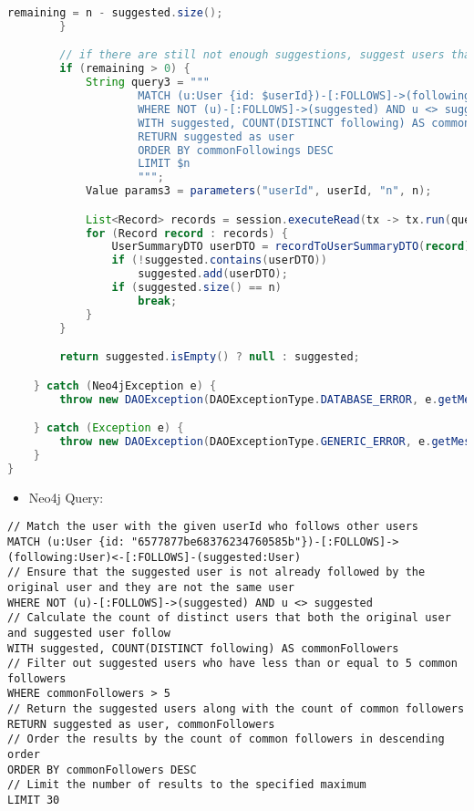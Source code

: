 \begin{mdframed}[style=customstyle]
\begin{lstlisting}[language=java]
            remaining = n - suggested.size();
        }

        // if there are still not enough suggestions, suggest users that follow the user's followings
        if (remaining > 0) {
            String query3 = """
                    MATCH (u:User {id: $userId})-[:FOLLOWS]->(following:User)<-[:FOLLOWS]-(suggested:User)
                    WHERE NOT (u)-[:FOLLOWS]->(suggested) AND u <> suggested
                    WITH suggested, COUNT(DISTINCT following) AS commonFollowings
                    RETURN suggested as user
                    ORDER BY commonFollowings DESC
                    LIMIT $n
                    """;
            Value params3 = parameters("userId", userId, "n", n);

            List<Record> records = session.executeRead(tx -> tx.run(query3, params3).list());
            for (Record record : records) {
                UserSummaryDTO userDTO = recordToUserSummaryDTO(record);
                if (!suggested.contains(userDTO))
                    suggested.add(userDTO);
                if (suggested.size() == n)
                    break;
            }
        }

        return suggested.isEmpty() ? null : suggested;

    } catch (Neo4jException e) {
        throw new DAOException(DAOExceptionType.DATABASE_ERROR, e.getMessage());

    } catch (Exception e) {
        throw new DAOException(DAOExceptionType.GENERIC_ERROR, e.getMessage());
    }
}\end{lstlisting}
\end{mdframed}

\begin{itemize}
    \item Neo4j Query:
\end{itemize}

\begin{mdframed}[style=customstyle2]
\begin{lstlisting}[language=Cypher, backgroundcolor=\color{white}]
// Match the user with the given userId who follows other users
MATCH (u:User {id: "6577877be68376234760585b"})-[:FOLLOWS]->(following:User)<-[:FOLLOWS]-(suggested:User)
// Ensure that the suggested user is not already followed by the original user and they are not the same user
WHERE NOT (u)-[:FOLLOWS]->(suggested) AND u <> suggested 
// Calculate the count of distinct users that both the original user and suggested user follow
WITH suggested, COUNT(DISTINCT following) AS commonFollowers 
// Filter out suggested users who have less than or equal to 5 common followers
WHERE commonFollowers > 5 
// Return the suggested users along with the count of common followers
RETURN suggested as user, commonFollowers 
// Order the results by the count of common followers in descending order
ORDER BY commonFollowers DESC 
// Limit the number of results to the specified maximum
LIMIT 30\end{lstlisting}
\end{mdframed}

